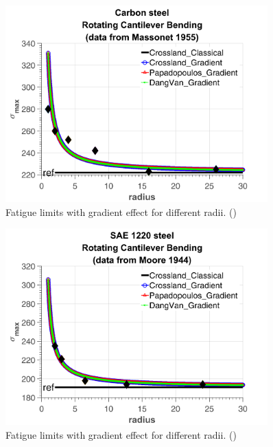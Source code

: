 \newpage
\begin{figure}[!h]
	\begin{center}
		\includegraphics[width=0.9\textwidth]{figures//carbonsteel.png} 
		\caption{Fatigue limits with gradient effect for different radii. (\cite{Massonnet1955})}
		\label{fig.gradientcalibration1}
	\end{center}
\end{figure}

\begin{figure}[!h]
	\begin{center}
		\includegraphics[width=0.9\textwidth]{figures//1220steel.png} 
		\caption{Fatigue limits with gradient effect for different radii. (\cite{Moore1944})}
		\label{fig.gradientcalibration2}
	\end{center}
\end{figure}

